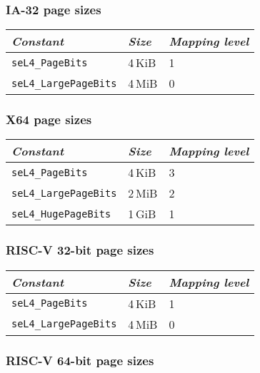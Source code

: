 \subsubsection{IA-32 page sizes}

\begin{tabularx}{\textwidth}{Xll} \toprule
    \emph{Constant}             & \emph{Size} & \emph{Mapping level} \\ \midrule
    \texttt{seL4\_PageBits}      & 4\,KiB      & 1                   \\
    \texttt{seL4\_LargePageBits} & 4\,MiB      & 0                   \\
    \bottomrule
\end{tabularx}

\subsubsection{X64 page sizes}

\begin{tabularx}{\textwidth}{Xll} \toprule
    \emph{Constant}             & \emph{Size} & \emph{Mapping level} \\ \midrule
    \texttt{seL4\_PageBits}      & 4\,KiB      & 3                   \\
    \texttt{seL4\_LargePageBits} & 2\,MiB      & 2                   \\
    \texttt{seL4\_HugePageBits}  & 1\,GiB      & 1                   \\
    \bottomrule
\end{tabularx}

\subsubsection{RISC-V 32-bit page sizes}

\begin{tabularx}{\textwidth}{Xll} \toprule
    \emph{Constant}             & \emph{Size} & \emph{Mapping level} \\ \midrule
    \texttt{seL4\_PageBits}      & 4\,KiB      & 1                   \\
    \texttt{seL4\_LargePageBits} & 4\,MiB      & 0                   \\
    \bottomrule
\end{tabularx}

\subsubsection{RISC-V 64-bit page sizes}

